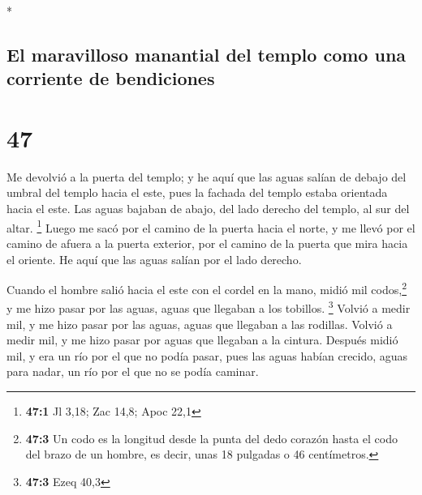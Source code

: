 \begin{paracol}{2}
\begin{otherlanguage}{english}
\end{otherlanguage}

\switchcolumn[0]*

\hypertarget{el-maravilloso-manantial-del-templo-como-una-corriente-de-bendiciones}{%
\subsection{El maravilloso manantial del templo como una corriente de
bendiciones}\label{el-maravilloso-manantial-del-templo-como-una-corriente-de-bendiciones}}

\hypertarget{section-92}{%
\section{47}\label{section-92}}

 Me devolvió a la puerta del templo; y he aquí que las
aguas salían de debajo del umbral del templo hacia el este, pues la
fachada del templo estaba orientada hacia el este. Las aguas bajaban de
abajo, del lado derecho del templo, al sur del altar. \footnote{\textbf{47:1}
  Jl 3,18; Zac 14,8; Apoc 22,1}  Luego me sacó por el
camino de la puerta hacia el norte, y me llevó por el camino de afuera a
la puerta exterior, por el camino de la puerta que mira hacia el
oriente. He aquí que las aguas salían por el lado derecho.

 Cuando el hombre salió hacia el este con el cordel en la
mano, midió mil codos,\footnote{\textbf{47:3} Un codo es la longitud
  desde la punta del dedo corazón hasta el codo del brazo de un hombre,
  es decir, unas 18 pulgadas o 46 centímetros.} y me hizo pasar por las
aguas, aguas que llegaban a los tobillos. \footnote{\textbf{47:3} Ezeq
  40,3}  Volvió a medir mil, y me hizo pasar por las
aguas, aguas que llegaban a las rodillas. Volvió a medir mil, y me hizo
pasar por aguas que llegaban a la cintura.  Después midió
mil, y era un río por el que no podía pasar, pues las aguas habían
crecido, aguas para nadar, un río por el que no se podía caminar.


\end{paracol}
